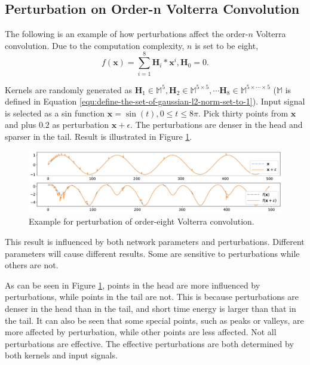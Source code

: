 \documentclass[twoside,11pt]{article}
\def\tvar#1{\mathbf{#1}} %
\begin{document}
\subsection{Perturbation on Order-n Volterra Convolution}
\label{subsec:perturbation-on-order-n-volterra-convolution}

The following is an example of how perturbations affect the order-\(n\) Volterra convolution. Due to the computation complexity, \(n\) is set to be eight,
\begin{equation*}
  f(\tvar{x}) = \sum_{i=1}^{8} \tvar{H}_i * \tvar{x}^i, \tvar{H}_0 = 0.
\end{equation*}

Kernels are randomly generated as \(
\tvar{H}_1 \in \mathbb{M}^{5},
\tvar{H}_2 \in \mathbb{M}^{5 \times 5},
\cdots
\tvar{H}_8 \in \mathbb{M}^{5 \times \cdots \times 5}\) (\(\mathbb{M}\) is defined in Equation \ref{equ:define-the-set-of-gaussian-l2-norm-set-to-1}).
Input signal is selected as a sin function \(\tvar{x} = \sin(t), 0 \le t \le 8 \pi\).
Pick thirty points from \(\tvar{x}\) and plus \(0.2\) as perturbation \(\tvar{x} + \epsilon\). The perturbations are denser in the head and sparser in the tail.
Result is illustrated in Figure \ref{fig:example-for-perturbation-of-o8-volterra-convolution}.


\begin{figure}[htb]
  \centering
  \includegraphics[width=0.98\linewidth]{img/perturbation-order-8-noisy-30-eng-0.2.pdf}
  \caption{Example for perturbation of order-eight Volterra convolution.}
  \label{fig:example-for-perturbation-of-o8-volterra-convolution}
\end{figure}

This result is influenced by both network parameters and perturbations. Different parameters will cause different results. Some are sensitive to perturbations while others are not.

As can be seen in Figure \ref{fig:example-for-perturbation-of-o8-volterra-convolution}, points in the head are more influenced by perturbations, while points in the tail are not. This is because perturbations are denser in the head than in the tail, and short time energy is larger than that in the tail.
It can also be seen that some special points, such as peaks or valleys, are more affected by perturbation, while other points are less affected.
Not all perturbations are effective. The effective perturbations are both determined by both kernels and input signals.
\end{document}
